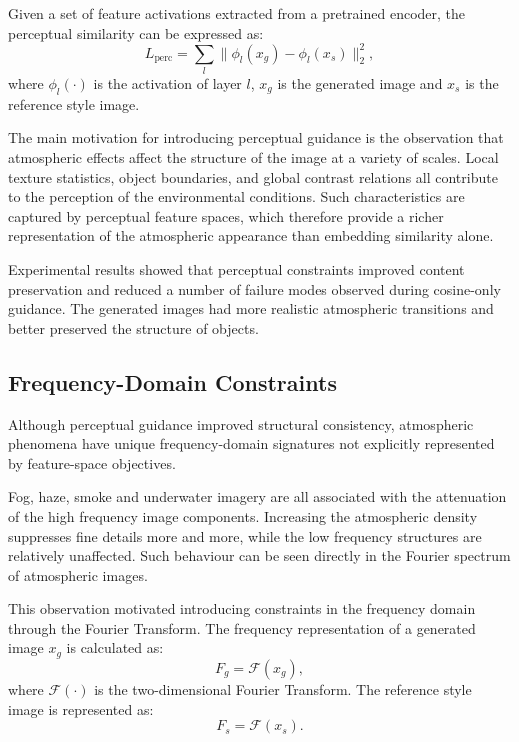 Given a set of feature activations extracted from a pretrained encoder, the perceptual similarity can be expressed as:
\begin{equation}
    L_{\text{perc}} = \sum_{l} \bigl\|\phi_l(x_g) - \phi_l(x_s)\bigr\|_2^2,
\end{equation}
where $\phi_l(\cdot)$ is the activation of layer $l$, $x_g$ is the generated image and $x_s$ is the reference style image.

The main motivation for introducing perceptual guidance is the observation that atmospheric effects affect the structure of the image at a variety of scales. Local texture statistics, object boundaries, and global contrast relations all contribute to the perception of the environmental conditions. Such characteristics are captured by perceptual feature spaces, which therefore provide a richer representation of the atmospheric appearance than embedding similarity alone.

Experimental results showed that perceptual constraints improved content preservation and reduced a number of failure modes observed during cosine-only guidance. The generated images had more realistic atmospheric transitions and better preserved the structure of objects.

\subsection{Frequency-Domain Constraints}
\label{sec:ch7_freq}

Although perceptual guidance improved structural consistency, atmospheric phenomena have unique frequency-domain signatures not explicitly represented by feature-space objectives.

Fog, haze, smoke and underwater imagery are all associated with the attenuation of the high frequency image components. Increasing the atmospheric density suppresses fine details more and more, while the low frequency structures are relatively unaffected. Such behaviour can be seen directly in the Fourier spectrum of atmospheric images.

This observation motivated introducing constraints in the frequency domain through the Fourier Transform. The frequency representation of a generated image $x_g$ is calculated as:
\begin{equation}
    F_g = \mathcal{F}(x_g),
\end{equation}
where $\mathcal{F}(\cdot)$ is the two-dimensional Fourier Transform. The reference style image is represented as:
\begin{equation}
    F_s = \mathcal{F}(x_s).
\end{equation}

